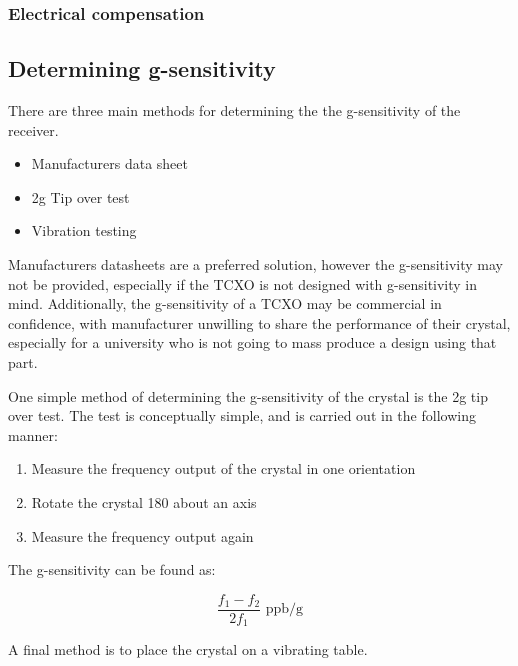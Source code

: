 \subsubsection{Electrical compensation}

\subsection{Determining g-sensitivity}
There are three main methods for determining the the g-sensitivity of the receiver.

\begin{itemize}
\item{Manufacturers data sheet}
\item{2g Tip over test}
\item{Vibration testing}
\end{itemize}

Manufacturers datasheets are a preferred solution, however the g-sensitivity may not be provided, especially if the \ac{TCXO} is not designed with g-sensitivity in mind. Additionally,  the g-sensitivity of a \ac{TCXO} may be commercial in confidence, with manufacturer unwilling to share the performance of their crystal, especially for a university who is not going to mass produce a design using that part. 

One simple method of determining the g-sensitivity of the crystal is the 2g tip over test. The test is conceptually simple, and is carried out in the following manner:

\begin{enumerate}
\item{Measure the frequency output of the crystal in one orientation}
\item{Rotate the crystal 180 \degree about an axis}
\item{Measure the frequency output again}
\end{enumerate}

 The g-sensitivity can be found as:

\begin{equation}
\frac{f_1-f_2}{2 f_1}\text{ ppb/g}
\end{equation}

A final method is to place the crystal on a vibrating table. 

